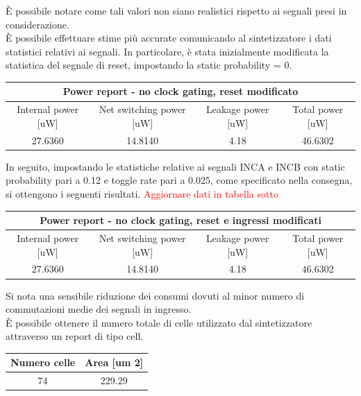\documentclass[11pt,  english, makeidx, a4paper, titlepage, oneside]{book}
\begin{document}
\vspace{0.3cm}
È possibile notare come tali valori non siano realistici rispetto ai segnali presi in considerazione.
\\
È possibile effettuare stime più accurate comunicando al sintetizzatore i dati statistici relativi ai segnali. In particolare, è stata inizialmente modificata la statistica del segnale di reset, impostando la static probability = 0.
\\
\begin{center}
	\begin{tabular}{|c|c|c|c|}
	\hline
	\multicolumn{4}{c}{Power report - no clock gating, reset modificato}\\
	\hline
	Internal power [uW] & Net switching power [uW] & Leakage power [uW] & Total power [uW] \\
	\hline
	 27.6360 & 14.8140  & 4.18  &  46.6302 \\
	\hline
	\end{tabular}	
\end{center}
\vspace{0.3cm}
In seguito, impostando le statistiche relative ai segnali INCA e INCB con static probability pari a 0.12 e toggle rate pari a 0.025, come specificato nella consegna, si ottengono i seguenti risultati.
\textcolor{red}{Aggiornare dati in tabella sotto}
\\
\begin{center}
	\begin{tabular}{|c|c|c|c|}
	\hline
	\multicolumn{4}{c}{Power report - no clock gating, reset e ingressi modificati}\\
	\hline
	Internal power [uW] & Net switching power [uW] & Leakage power [uW] & Total power [uW] \\
	\hline
	 27.6360 & 14.8140  & 4.18  &  46.6302 \\
	\hline
	\end{tabular}	
\end{center}
\vspace{0.3cm}
Si nota una sensibile riduzione dei consumi dovuti al minor numero di commutazioni medie dei segnali in ingresso.
\\
È possibile ottenere il numero totale di celle utilizzato dal sintetizzatore attraverso un report di tipo cell.
\\
\begin{center}
	\begin{tabular}{|c|c|}
	\hline
	Numero celle & Area [um 2] \\
	\hline
	 74 & 229.29 \\
	\hline
	\end{tabular}	
\end{center}
\end{document}
